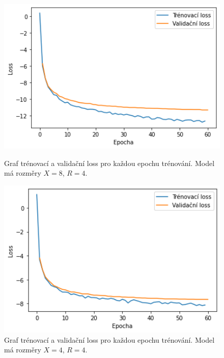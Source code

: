 \begin{figure}[H]
    \centering
    \begin{minipage}{0.45\textwidth}
        \centering
        \includegraphics[width=1.0\textwidth]{obrazky-figures/expX8R4validtrainloss.png}
        \caption{\label{graf:X8R4validtrainloss}Graf trénovací a validační loss pro každou epochu trénování. Model má rozměry $X=8$, $R=4$.}
    \end{minipage}\hfill
    \begin{minipage}{0.45\textwidth}
        \centering
        \includegraphics[width=1.0\textwidth]{obrazky-figures/expX4R4validtrainloss.png}
        \caption{\label{graf:X4R4validtrainloss}Graf trénovací a validační loss pro každou epochu trénování. Model má rozměry $X=4$, $R=4$.}
    \end{minipage}
\end{figure}


